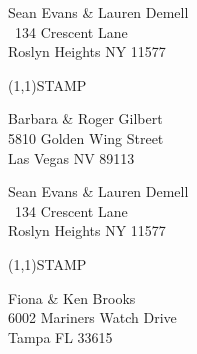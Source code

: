\documentclass[12pt]{article}
\begin{document}
\pagestyle{empty}
\setlength{\unitlength}{1in}

\begin{minipage}{.5\linewidth} \noindent
Sean Evans \& Lauren Demell\\\ 
134 Crescent Lane\\ 
Roslyn Heights NY 11577
\end{minipage}
\begin{minipage}{.5\linewidth \hspace{-.2in} \vspace{-.3in}}
\begin{flushright}
\framebox(1,1){STAMP}
\end{flushright}
\end{minipage}

\begin{center} \begin{Huge} \vspace*{\fill}
Barbara \& Roger Gilbert\\
5810 Golden Wing Street\\
Las Vegas NV 89113\\
\vspace{\fill} \end{Huge} \end{center}

\clearpage

\begin{minipage}{.5\linewidth} \noindent
Sean Evans \& Lauren Demell\\\ 
134 Crescent Lane\\ 
Roslyn Heights NY 11577
\end{minipage}
\begin{minipage}{.5\linewidth \hspace{-.2in} \vspace{-.3in}}
\begin{flushright}
\framebox(1,1){STAMP}
\end{flushright}
\end{minipage}

\begin{center} \begin{Huge} \vspace*{\fill}
Fiona \& Ken Brooks\\
6002 Mariners Watch Drive\\
Tampa FL 33615\\
\vspace{\fill} \end{Huge} \end{center}
\end{document}
